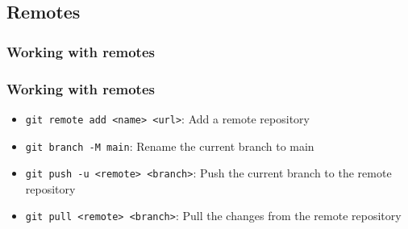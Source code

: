 \documentclass{beamer}
\begin{document}
    \subsection{Remotes}\label{subsec:remotes}
    \begin{frame}
        \frametitle{Working with remotes}
        \begin{figure}[H]
            \centering
            \noindent
        \end{figure}
    \end{frame}
    \begin{frame}
        \frametitle{Working with remotes}
        \begin{itemize}
            \item \texttt{git remote add <name> <url>}: Add a remote repository
            \item \texttt{git branch -M main}: Rename the current branch to main
            \item \texttt{git push -u <remote> <branch>}: Push the current branch to the remote repository
            \item \texttt{git pull <remote> <branch>}: Pull the changes from the remote repository
        \end{itemize}
    \end{frame}
\end{document}
